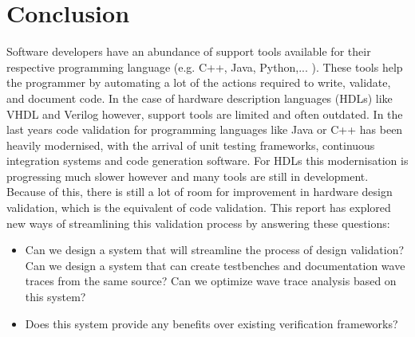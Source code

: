 
\chapter{Conclusion}
Software developers have an abundance of support tools available for their respective programming language (e.g. C++, Java, Python,... ). These tools help the programmer by automating a lot of the actions required to write, validate, and document code. In the case of hardware description languages (HDLs) like VHDL and Verilog however, support tools are limited and often outdated. In the last years code validation for programming languages like Java or C++ has been heavily modernised, with the arrival of unit testing frameworks, continuous integration systems and code generation software. 
\npar
For HDLs this modernisation is progressing much slower however and many tools are still in development. Because of this, there is still a lot of room for improvement in hardware design validation, which is the equivalent of code validation. 
\npar
This report has explored new ways of streamlining this validation process by answering these questions:
\begin{itemize}
	\item Can we design a system that will streamline the process of design validation?
	\subitem Can we design a system that can create testbenches and documentation wave traces from the same source?
	\subitem Can we optimize wave trace analysis based on this system?
	\item Does this system provide any benefits over existing verification frameworks?
\end{itemize}
